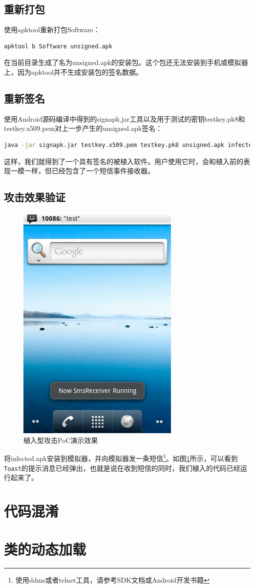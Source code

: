 \subsection{重新打包}
使用apktool重新打包Software：
\begin{lstlisting}[language=bash, numbers=none]
apktool b Software unsigned.apk
\end{lstlisting}
在当前目录生成了名为unsigned.apk的安装包。这个包还无法安装到手机或模拟器上，因为apktool并不生成安装包的签名数据。
\subsection{重新签名}
使用Android源码编译中得到的signapk.jar工具以及用于测试的密钥testkey.pk8和testkey.x509.pem对上一步产生的unsigned.apk签名：
\begin{lstlisting}[language=bash, numbers=none]
java -jar signapk.jar testkey.x509.pem testkey.pk8 unsigned.apk infected.apk
\end{lstlisting}
这样，我们就得到了一个具有签名的被植入软件。用户使用它时，会和植入前的表现一模一样，但已经包含了一个短信事件接收器。
\subsection{攻击效果验证}
\begin{figure}[htb]
	\centering
	\includegraphics[width=8cm]{image/toast.jpg}
 	 \caption{植入型攻击PoC演示效果}
	 \label{Fig:Toast}
\end{figure}
将infected.apk安装到模拟器，并向模拟器发一条短信\footnote{使用ddms或者telnet工具，请参考SDK文档或Android开发书籍}。如图\ref{Fig:Toast}所示，可以看到\lstinline!Toast!的提示消息已经弹出，也就是说在收到短信的同时，我们植入的代码已经运行起来了。
\section{代码混淆}
\section{类的动态加载}
